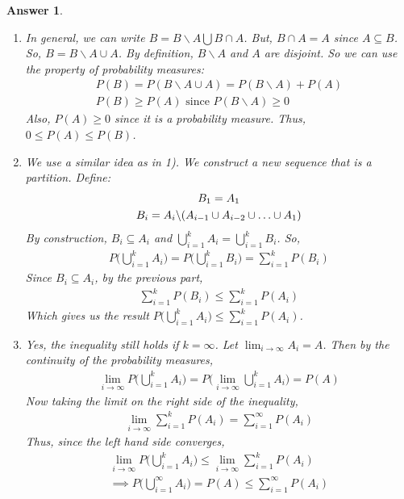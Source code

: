 \documentclass[12pt]{article}
\theoremstyle{colon}
\newtheorem*{answer}{Answer}
\begin{document}
\begin{answer}
  \leavevmode
  \begin{enumerate}[label=\arabic*)]
    \item In general, we can write $B = B \backslash A \bigcup B \cap A$. But, $B \cap A = A$ since $A \subseteq B$. So, $B = B \backslash A \cup A$. By definition, $B \backslash A$ and $A$ are disjoint. So we can use the property of probability measures:
      \begin{gather*}
        P(B) = P(B \backslash A \cup A) = P(B \backslash A) + P(A) \\
        P(B) \geq P(A) \text{ since } P(B \backslash A) \geq 0
      \end{gather*}
      Also, $P(A) \geq 0$ since it is a probability measure. Thus, $0 \leq P(A) \leq P(B)$.
    \item We use a similar idea as in 1). We construct a new sequence that is a partition. Define:
      \begin{gather*}
        B_1 = A_1 \\
        B_i = A_i \backslash (A_{i-1} \cup A_{i-2} \cup \mathellipsis \cup A_{1})
      \end{gather*}
      By construction, $B_i \subseteq A_i$ and $\bigcup\limits_{i=1}^k A_i = \bigcup\limits_{i=1}^k B_i$. So,
      \begin{gather*}
        P \big( \bigcup\limits_{i=1}^k A_i \big) = P \big( \bigcup\limits_{i=1}^k B_i \big) = \sum\limits_{i=1}^k P(B_i)
      \end{gather*}
      Since $B_i \subseteq A_i$, by the previous part,
      \begin{gather*}
        \sum\limits_{i=1}^k P(B_i) \leq \sum\limits_{i=1}^k P(A_i)
      \end{gather*}
      Which gives us the result $P \big( \bigcup\limits_{i=1}^k A_i \big) \leq \sum\limits_{i=1}^k P(A_i)$.
    \item Yes, the inequality still holds if $k = \infty$. Let $\lim_{i \rightarrow \infty} A_i = A$. Then by the continuity of the probability measures,
      \begin{gather*}
        \lim_{i \rightarrow \infty} P \big( \bigcup\limits_{i=1}^k A_i \big) = P \big( \lim_{i \rightarrow \infty} \bigcup\limits_{i=1}^k A_i \big) = P(A)
      \end{gather*}
      Now taking the limit on the right side of the inequality,
      \begin{gather*}
        \lim_{i \rightarrow \infty} \sum\limits_{i=1}^k P(A_i) = \sum\limits_{i=1}^\infty P(A_i)
      \end{gather*}
      Thus, since the left hand side converges,
      \begin{gather*}
        \lim_{i \rightarrow \infty} P \big( \bigcup\limits_{i=1}^k A_i \big) \leq \lim_{i \rightarrow \infty} \sum\limits_{i=1}^k P(A_i) \\
        \implies P \big( \bigcup\limits_{i=1}^\infty A_i \big) = P(A) \leq \sum\limits_{i=1}^\infty P(A_i)
      \end{gather*}
  \end{enumerate}
\end{answer}
\end{document}
